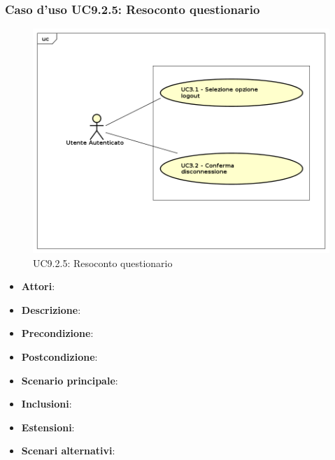 		\subsubsection{Caso d'uso UC9.2.5: Resoconto questionario}
		\label{UC9.2.5}
		\begin{figure}[h]
			\centering
		\includegraphics[scale=0.7,keepaspectratio]{UML/UC9.png}
			\caption{UC9.2.5: Resoconto questionario}
		\end{figure}
		\FloatBarrier
		\begin{itemize}
			\item \textbf{Attori}: 
			\item \textbf{Descrizione}: 
			\item \textbf{Precondizione}: 
			\item \textbf{Postcondizione}: 
			\item \textbf{Scenario principale}:
			\item \textbf{Inclusioni}:
			\item \textbf{Estensioni}:
			\item \textbf{Scenari alternativi}:
		\end{itemize}
		
